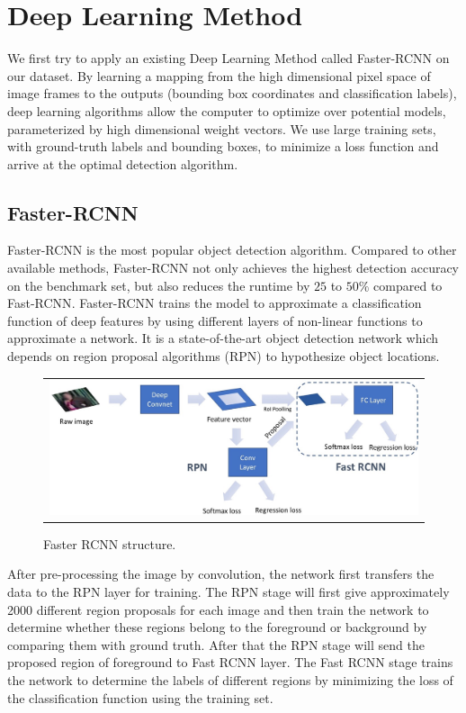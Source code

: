 \documentclass[a4paper]{article}
\begin{document}
\section{Deep Learning Method}
We first try to apply an existing Deep Learning Method called Faster-RCNN\cite{fasterrcnn} on our dataset. By learning a mapping from the high dimensional pixel space of image frames to the outputs (bounding box coordinates and classification labels), deep learning algorithms allow the computer to optimize over potential models, parameterized by high dimensional weight vectors. We use large training sets, with ground-truth labels and bounding boxes, to minimize a loss function and arrive at the optimal detection algorithm.
\subsection{Faster-RCNN}
Faster-RCNN\cite{fasterrcnn} is the most popular object detection algorithm. Compared to other available methods, Faster-RCNN not only achieves the highest detection accuracy on the benchmark set, but also reduces the runtime by $25$ to $50\%$ compared to Fast-RCNN\cite{fastrcnn}. Faster-RCNN  trains the model to approximate a classification function of deep features by using different layers of non-linear functions to approximate a network. It is a state-of-the-art object detection network which depends on region proposal algorithms (RPN) to hypothesize object locations.\\
\begin{figure}[H]
\begin{center}
\begin{tabular}{c}
\includegraphics[width=1.0\textwidth]{Fasterpipeline.jpg}\\
\end{tabular}
\end{center}
\caption{Faster RCNN structure.}
\label{structure}
\end{figure}

After pre-processing the image by convolution, the network first transfers the data to the RPN layer for training. The RPN stage will first give approximately 2000 different region proposals for each image and then train the network to determine whether these regions belong to the foreground or background by comparing them with ground truth. After that the RPN stage will send the proposed region of foreground to Fast RCNN layer. The Fast RCNN stage trains the network to determine the labels of different regions by minimizing the loss of the classification function using the training set.
\end{document}
